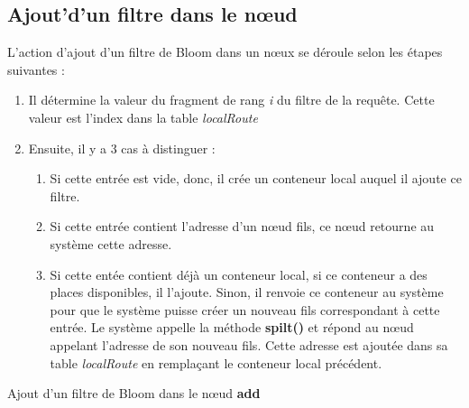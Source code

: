 \documentclass[a4paper,11pt]{report}
\begin{document}
\subsection{Ajout'd'un filtre dans le nœud}
	L'action d'ajout d'un filtre de Bloom dans un nœux se déroule selon les étapes suivantes : 
	\begin{enumerate}
		\item Il détermine la valeur du fragment de rang \textit{i} du filtre de la requête. Cette valeur est l'index dans la table \textit{localRoute}
		\item Ensuite, il y a 3 cas à distinguer :
			\begin{enumerate}
				\item Si cette entrée est vide, donc, il crée un conteneur local auquel il ajoute ce filtre.
				\item Si cette entrée contient l'adresse d'un nœud fils, ce nœud retourne au système cette adresse.
				\item Si cette entée contient déjà un conteneur local, si ce conteneur a des places disponibles, il l'ajoute. Sinon, il renvoie ce conteneur au système pour que le système puisse créer un nouveau fils correspondant à cette entrée. Le système appelle la méthode \textbf{spilt()} et répond au nœud appelant l'adresse de son nouveau fils. Cette adresse est ajoutée dans sa table \textit{localRoute} en remplaçant le conteneur local précédent.
			\end{enumerate}
\end{enumerate}

\begin{algorithme}
	Ajout d'un filtre de Bloom dans le nœud \textbf{add}
\end{algorithme}
\end{document}
